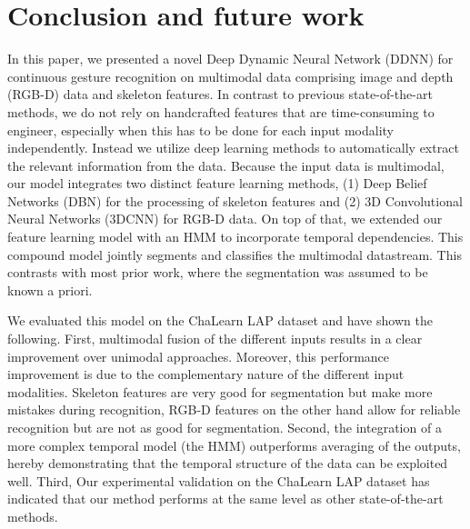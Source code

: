 
\section{Conclusion and future work}
\label{sec:conclusion}

%
In this paper, we presented a novel Deep Dynamic Neural Network (DDNN) for continuous gesture recognition on multimodal data comprising image and depth (RGB-D) data and skeleton features. %
In contrast to previous state-of-the-art methods, we do not rely on handcrafted features that are time-consuming to engineer, especially when this has to be done for each input modality independently. Instead we utilize deep learning methods to automatically extract the relevant information from the data. 
Because the input data is multimodal, our model integrates two distinct feature learning methods, (1) Deep Belief Networks (DBN) for the processing of skeleton features and (2) 3D Convolutional Neural Networks (3DCNN) for RGB-D data. On top of that, we  extended our feature learning model with an HMM to incorporate temporal dependencies.
This compound model  jointly segments and classifies the multimodal datastream. This contrasts with most prior work, where the segmentation was assumed to be known a priori. 

We evaluated this model on the ChaLearn LAP dataset and have shown the following.  First, multimodal fusion of the different inputs results in a clear improvement over unimodal approaches. Moreover, this performance improvement is due to the complementary nature of the different input modalities. Skeleton features are very good for segmentation but make more mistakes during recognition, RGB-D features on the other hand allow for reliable recognition but are not as good for segmentation.
Second, the integration of a more complex temporal model (the HMM) outperforms averaging of the outputs, hereby demonstrating that the temporal structure of the data can be exploited well. Third, 
Our experimental validation on the ChaLearn LAP dataset has indicated that our method performs at the same level as other state-of-the-art methods. 

